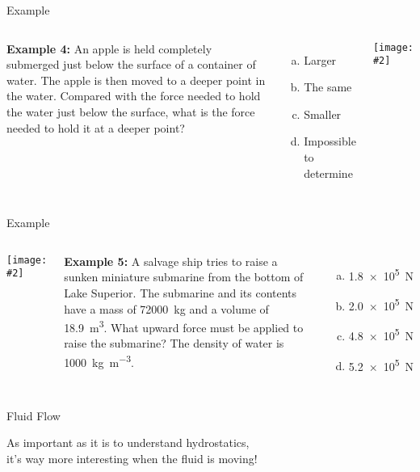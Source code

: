 \documentclass[12pt,aspectratio=169]{beamer}
\newcommand{\pic}[2]{\texttt{[image: \#2]}}
\begin{document}
\begin{frame}{Example}
  \begin{columns}
    \textbf{Example 4:} An apple is held completely submerged just below the
    surface of a container of water. The apple is then moved to a deeper point
    in the water. Compared with the force needed to hold the water just below
    the surface, what is the force needed to hold it at a deeper point?
    \begin{enumerate}[(a)]
    \item Larger
    \item The same
    \item Smaller
    \item Impossible to determine
    \end{enumerate}

    \pic{1}{apple.jpg}
  \end{columns}
\end{frame}



\begin{frame}{Example}
  \begin{columns}
    \pic{1}{hpa_b.jpg}

    \textbf{Example 5:} A salvage ship tries to raise a sunken miniature
    submarine from the bottom of Lake Superior. The submarine and its contents
    have a mass of \SI{72000}{\kilo\gram} and a volume of \SI{18.9}{\metre^3}.
    What upward force must be applied to raise the submarine? The density of
    water is \SI{1000}{\kilo\gram\per\metre^3}.
    \begin{enumerate}[(a)]
    \item\SI{1.8e5}{\newton}
    \item\SI{2.0e5}{\newton}
    \item\SI{4.8e5}{\newton}
    \item\SI{5.2e5}{\newton}
    \end{enumerate}
  \end{columns}
\end{frame}



\begin{frame}{Fluid Flow}
  \begin{center}
    As important as it is to understand hydrostatics,\\
    it's way more interesting when the fluid is moving!
  \end{center}
\end{frame}
\end{document}
